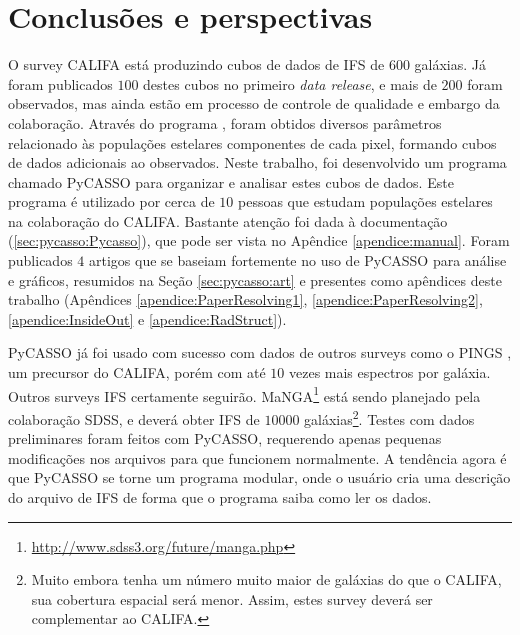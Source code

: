 



\chapter{Conclusões e perspectivas}
\label{sec:conclusao}

O survey CALIFA está produzindo cubos de dados de IFS de $600$ galáxias. Já
foram publicados $100$ destes cubos no primeiro {\em data release}, e mais de
$200$ foram observados, mas ainda estão em processo de controle de qualidade e
embargo da colaboração. Através do programa \starlight, foram obtidos diversos
parâmetros relacionado às populações estelares componentes de cada pixel,
formando cubos de dados adicionais ao observados. Neste trabalho, foi
desenvolvido um programa chamado PyCASSO para organizar e analisar estes cubos
de dados. Este programa é utilizado por cerca de $10$ pessoas que estudam
populações estelares na colaboração do CALIFA. Bastante atenção foi dada à
documentação (\ref{sec:pycasso:Pycasso}), que pode ser vista no Apêndice
\ref{apendice:manual}. Foram publicados $4$ artigos que se baseiam fortemente no
uso de PyCASSO para análise e gráficos, resumidos na Seção \ref{sec:pycasso:art}
e presentes como apêndices deste trabalho (Apêndices
\ref{apendice:PaperResolving1}, \ref{apendice:PaperResolving2},
\ref{apendice:InsideOut} e \ref{apendice:RadStruct}).

PyCASSO já foi usado com sucesso com dados de outros surveys como o PINGS
\citep{RosalesOrtega2010}, um precursor do CALIFA, porém com até $10$ vezes mais
espectros por galáxia. Outros surveys IFS certamente seguirão.
MaNGA\footnote{\url{http://www.sdss3.org/future/manga.php}} está sendo planejado
pela colaboração SDSS, e deverá obter IFS de $10000$ galáxias\footnote{Muito
embora tenha um número muito maior de galáxias do que o CALIFA, sua cobertura
espacial será menor. Assim, estes survey deverá ser complementar ao CALIFA.}.
Testes com dados preliminares foram feitos com PyCASSO, requerendo apenas
pequenas modificações nos arquivos para que funcionem normalmente. A tendência
agora é que PyCASSO se torne um programa modular, onde o usuário cria uma
descrição do arquivo de IFS de forma que o programa saiba como ler os dados.


